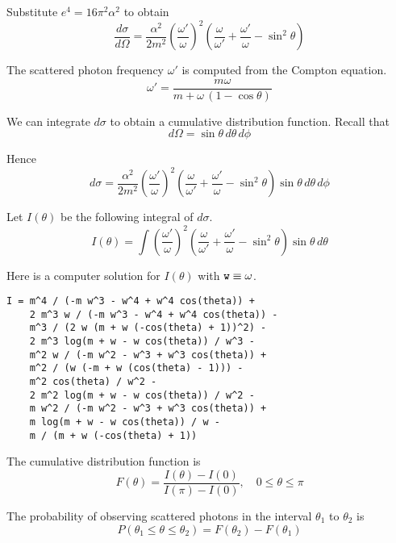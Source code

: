 \documentclass[12pt]{article}
\begin{document}
\noindent
Substitute $e^4=16\pi^2\alpha^2$ to obtain
\begin{equation*}
\frac{d\sigma}{d\Omega}
=\frac{\alpha^2}{2m^2}
\left(\frac{\omega'}{\omega}\right)^2
\left(
\frac{\omega}{\omega'}+\frac{\omega'}{\omega}-\sin^2\theta
\right)
\end{equation*}

\noindent
The scattered photon frequency $\omega'$ is computed from the Compton equation.
\begin{equation*}
\omega'=\frac{m\omega}{m+\omega\,(1-\cos\theta)}
\end{equation*}

\noindent
We can integrate $d\sigma$ to obtain a cumulative distribution function.
Recall that
\begin{equation*}
d\Omega=\sin\theta\,d\theta\,d\phi
\end{equation*}

Hence
\begin{equation*}
d\sigma
=\frac{\alpha^2}{2m^2}
\left(\frac{\omega'}{\omega}\right)^2
\left(\frac{\omega}{\omega'}+\frac{\omega'}{\omega}-\sin^2\theta\right)
\sin\theta\,d\theta\,d\phi
\end{equation*}

Let $I(\theta)$ be the following integral of $d\sigma$.
\begin{equation*}
I(\theta)=
\int
\left(\frac{\omega'}{\omega}\right)^2
\left(\frac{\omega}{\omega'}+\frac{\omega'}{\omega}-\sin^2\theta\right)
\sin\theta\,d\theta
\end{equation*}

Here is a computer solution for $I(\theta)$ with $\text{\tt w}\equiv\omega$.
\begin{verbatim}
I = m^4 / (-m w^3 - w^4 + w^4 cos(theta)) +
    2 m^3 w / (-m w^3 - w^4 + w^4 cos(theta)) -
    m^3 / (2 w (m + w (-cos(theta) + 1))^2) -
    2 m^3 log(m + w - w cos(theta)) / w^3 -
    m^2 w / (-m w^2 - w^3 + w^3 cos(theta)) +
    m^2 / (w (-m + w (cos(theta) - 1))) -
    m^2 cos(theta) / w^2 -
    2 m^2 log(m + w - w cos(theta)) / w^2 -
    m w^2 / (-m w^2 - w^3 + w^3 cos(theta)) +
    m log(m + w - w cos(theta)) / w -
    m / (m + w (-cos(theta) + 1))
\end{verbatim}

The cumulative distribution function is
\begin{equation*}
F(\theta)=\frac{I(\theta)-I(0)}{I(\pi)-I(0)},
\quad
0\le\theta\le\pi
\end{equation*}

\noindent
The probability of observing scattered photons in the interval $\theta_1$ to $\theta_2$ is
\begin{equation*}
P(\theta_1\le\theta\le\theta_2)=F(\theta_2)-F(\theta_1)
\end{equation*}
\end{document}
